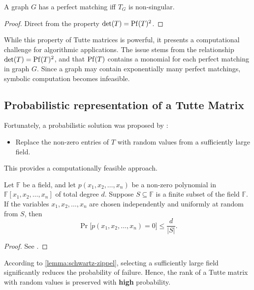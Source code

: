 \begin{fact}
    \label{fact:matching_condition}
    A graph \(G\) has a perfect matching iff \(T_G\) is non-singular.
\end{fact}

\begin{proof}
    Direct from the property \(\det(T) = \operatorname{Pf}(T)^2\).
\end{proof}

While this property of Tutte matrices is powerful, it presents a computational challenge for algorithmic applications. 
The issue stems from the relationship \(\det(T) = \operatorname{Pf}(T)^2\), and that \(\operatorname{Pf}(T)\) contains a monomial for each perfect matching in graph \(G\).
Since a graph may contain exponentially many perfect matchings, symbolic computation becomes infeasible.

\subsection{Probabilistic representation of a Tutte Matrix}
\label{sec:prob_tutte}
\noindent
Fortunately, a probabilistic solution was proposed by \citet{Lovasz:Random}:
\begin{itemize}
    \item Replace the non-zero entries of \(T\) with random values from a sufficiently large field.
\end{itemize}
This provides a computationally feasible approach.

\begin{lemma}
\label{lemma:schwartz-zippel}
Let \(\mathbb{F}\) be a field, and let \(p(x_1, x_2, \dots, x_n)\) be a non-zero polynomial in \(\mathbb{F}[x_1, x_2, \dots, x_n]\) of total degree \(d\). 
Suppose \(S \subseteq \mathbb{F}\) is a finite subset of the field \( \mathbb{F} \). 
If the variables \(x_1, x_2, \dots, x_n\) are chosen independently and uniformly at random from \( S \), then
\[
\Pr\big[p(x_1, x_2, \dots, x_n) = 0\big] \leq \frac{d}{|S|}.
\]
\end{lemma}

\begin{proof}
  See \citet[Theorem 7.2]{MotwaniRaghavan1995}.
\end{proof}

According to \cref{lemma:schwartz-zippel}, selecting a sufficiently large field significantly reduces the probability of failure.
Hence, the rank of a Tutte matrix with random values is preserved with \textbf{high} probability.

